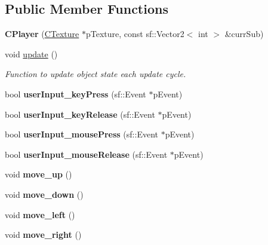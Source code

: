 \subsection*{Public Member Functions}
\begin{DoxyCompactItemize}
\item 
\hypertarget{classCPlayer_a983c63a3e18585a94f66f0bd23c57cd3}{{\bfseries C\-Player} (\hyperlink{classCTexture}{C\-Texture} $\ast$p\-Texture, const sf\-::\-Vector2$<$ int $>$ \&curr\-Sub)}\label{classCPlayer_a983c63a3e18585a94f66f0bd23c57cd3}

\item 
\hypertarget{classCPlayer_aa77025c046956b109a76d53c12a80fa5}{void \hyperlink{classCPlayer_aa77025c046956b109a76d53c12a80fa5}{update} ()}\label{classCPlayer_aa77025c046956b109a76d53c12a80fa5}

\begin{DoxyCompactList}\small\item\em Function to update object state each update cycle. \end{DoxyCompactList}\item 
\hypertarget{classCPlayer_ab91fc8d3c4e992dd20270d5743d75f06}{bool {\bfseries user\-Input\-\_\-key\-Press} (sf\-::\-Event $\ast$p\-Event)}\label{classCPlayer_ab91fc8d3c4e992dd20270d5743d75f06}

\item 
\hypertarget{classCPlayer_a8ef81a467d70f1e4529f3c905820311b}{bool {\bfseries user\-Input\-\_\-key\-Release} (sf\-::\-Event $\ast$p\-Event)}\label{classCPlayer_a8ef81a467d70f1e4529f3c905820311b}

\item 
\hypertarget{classCPlayer_ab73ca18309b25410b1fdb54a9ee60e67}{bool {\bfseries user\-Input\-\_\-mouse\-Press} (sf\-::\-Event $\ast$p\-Event)}\label{classCPlayer_ab73ca18309b25410b1fdb54a9ee60e67}

\item 
\hypertarget{classCPlayer_a915cf5ad902cddb376eb4c37d362e3b1}{bool {\bfseries user\-Input\-\_\-mouse\-Release} (sf\-::\-Event $\ast$p\-Event)}\label{classCPlayer_a915cf5ad902cddb376eb4c37d362e3b1}

\item 
\hypertarget{classCPlayer_a66e70893b9da823210b40638a19d6406}{void {\bfseries move\-\_\-up} ()}\label{classCPlayer_a66e70893b9da823210b40638a19d6406}

\item 
\hypertarget{classCPlayer_aaa672441a4b0b4544590492ddaf67e86}{void {\bfseries move\-\_\-down} ()}\label{classCPlayer_aaa672441a4b0b4544590492ddaf67e86}

\item 
\hypertarget{classCPlayer_acb93d455528a966b13f74371db2d60bc}{void {\bfseries move\-\_\-left} ()}\label{classCPlayer_acb93d455528a966b13f74371db2d60bc}

\item 
\hypertarget{classCPlayer_abdada73af7a83664c078260bc091a4ea}{void {\bfseries move\-\_\-right} ()}\label{classCPlayer_abdada73af7a83664c078260bc091a4ea}

\end{DoxyCompactItemize}
